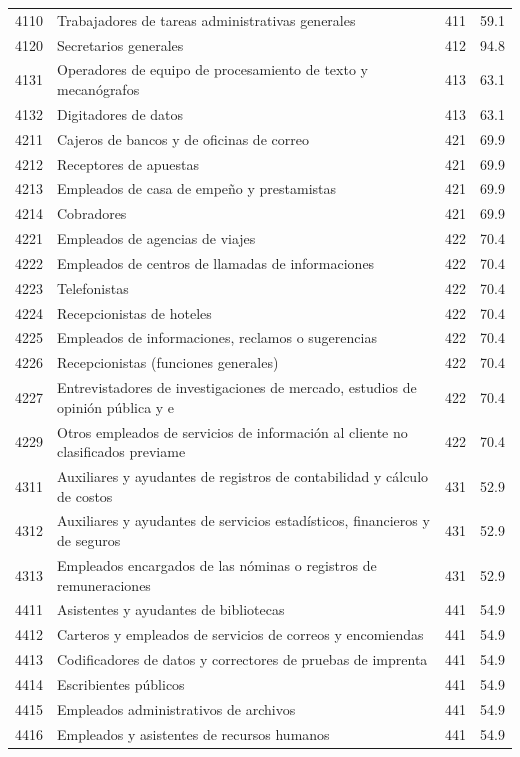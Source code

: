 \begin{longtable}{@{}c p{} c r@{}}
4110 & Trabajadores de tareas administrativas generales & 411 & 59.1 \\
4120 & Secretarios generales & 412 & 94.8 \\
4131 & Operadores de equipo de procesamiento de texto y mecanógrafos & 413 & 63.1 \\
4132 & Digitadores de datos & 413 & 63.1 \\
4211 & Cajeros de bancos y de oficinas de correo & 421 & 69.9 \\
4212 & Receptores de apuestas & 421 & 69.9 \\
4213 & Empleados de casa de empeño y prestamistas & 421 & 69.9 \\
4214 & Cobradores & 421 & 69.9 \\
4221 & Empleados de agencias de viajes & 422 & 70.4 \\
4222 & Empleados de centros de llamadas de informaciones & 422 & 70.4 \\
4223 & Telefonistas & 422 & 70.4 \\
4224 & Recepcionistas de hoteles & 422 & 70.4 \\
4225 & Empleados de informaciones, reclamos o sugerencias & 422 & 70.4 \\
4226 & Recepcionistas (funciones generales) & 422 & 70.4 \\
4227 & Entrevistadores de investigaciones de mercado, estudios de opinión pública y e & 422 & 70.4 \\
4229 & Otros empleados de servicios de información al cliente no clasificados previame & 422 & 70.4 \\
4311 & Auxiliares y ayudantes de registros de contabilidad y cálculo de costos & 431 & 52.9 \\
4312 & Auxiliares y ayudantes de servicios estadísticos, financieros y de seguros & 431 & 52.9 \\
4313 & Empleados encargados de las nóminas o registros de remuneraciones & 431 & 52.9 \\
4411 & Asistentes y ayudantes de bibliotecas & 441 & 54.9 \\
4412 & Carteros y empleados de servicios de correos y encomiendas & 441 & 54.9 \\
4413 & Codificadores de datos y correctores de pruebas de imprenta & 441 & 54.9 \\
4414 & Escribientes públicos & 441 & 54.9 \\
4415 & Empleados administrativos de archivos & 441 & 54.9 \\
4416 & Empleados y asistentes de recursos humanos & 441 & 54.9 \\

\end{longtable}
